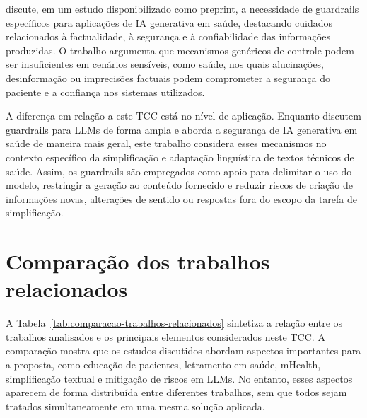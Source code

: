  discute, em um estudo disponibilizado como preprint, a necessidade de guardrails específicos para aplicações de IA generativa em saúde, destacando cuidados relacionados à factualidade, à segurança e à confiabilidade das informações produzidas. O trabalho argumenta que mecanismos genéricos de controle podem ser insuficientes em cenários sensíveis, como saúde, nos quais alucinações, desinformação ou imprecisões factuais podem comprometer a segurança do paciente e a confiança nos sistemas utilizados.

A diferença em relação a este TCC está no nível de aplicação. Enquanto  discutem guardrails para LLMs de forma ampla e  aborda a segurança de IA generativa em saúde de maneira mais geral, este trabalho considera esses mecanismos no contexto específico da simplificação e adaptação linguística de textos técnicos de saúde. Assim, os guardrails são empregados como apoio para delimitar o uso do modelo, restringir a geração ao conteúdo fornecido e reduzir riscos de criação de informações novas, alterações de sentido ou respostas fora do escopo da tarefa de simplificação.

\section{Comparação dos trabalhos relacionados}
\label{sec:comparacao-trabalhos-relacionados}

A Tabela~\ref{tab:comparacao-trabalhos-relacionados} sintetiza a relação entre os trabalhos analisados e os principais elementos considerados neste TCC. A comparação mostra que os estudos discutidos abordam aspectos importantes para a proposta, como educação de pacientes, letramento em saúde, mHealth, simplificação textual e mitigação de riscos em LLMs. No entanto, esses aspectos aparecem de forma distribuída entre diferentes trabalhos, sem que todos sejam tratados simultaneamente em uma mesma solução aplicada.

